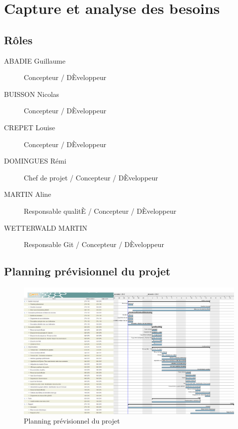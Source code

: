 \chapter{Capture et analyse des besoins}

\section{R\^oles}

\begin{description}
    \item[ABADIE Guillaume] Concepteur / DÈveloppeur
    \item[BUISSON Nicolas] Concepteur / DÈveloppeur
    \item[CREPET Louise] Concepteur / DÈveloppeur
    \item[DOMINGUES R\'emi] Chef de projet / Concepteur / DÈveloppeur
    \item[MARTIN Aline] Responsable qualitÈ / Concepteur / DÈveloppeur
    \item[WETTERWALD MARTIN] Responsable Git / Concepteur / DÈveloppeur
\end{description}

\section{Planning pr\'evisionnel du projet}

\begin{landscape}
\begin{figure}[h]
    \centering
    \includegraphics[width=240mm]{../diagrams/project_management/planning_previsionnel/planning_previsionnel.png}
    \caption{Planning pr\'evisionnel du projet}
    \label{diagram:planning_prevision}
\end{figure}
\end{landscape}
\pagebreak


